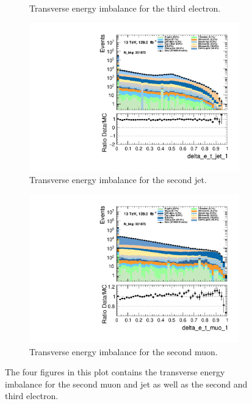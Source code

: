 \begin{figure}
\begin{subfigure}{.49\textwidth}
        \caption{Transverse energy imbalance for the third electron.}
        \label{fig:delta_e_t_ele_2}
    \end{subfigure}
    \hfill 
    \begin{subfigure}{.49\textwidth}
        \includegraphics[width=\textwidth]{Figures/MC_Data_comp/delta_e_t_jet_1.pdf}
        \caption{ Transverse energy imbalance for the second jet.}
        \label{fig:delta_e_t_jet1}
    \end{subfigure}
    \hfill
    \begin{subfigure}{.49\textwidth}
        \includegraphics[width=\textwidth]{Figures/MC_Data_comp/delta_e_t_muo_1.pdf}
        \caption{Transverse energy imbalance for the second muon. }
        \label{fig:delta_e_t_muo1}
    \end{subfigure}
    \hfill       
    \caption{The four figures in this plot contains the transverse energy imbalance for the second muon and jet as well as the second and third electron. }
    \label{fig:batch1_feats}
\end{figure}

